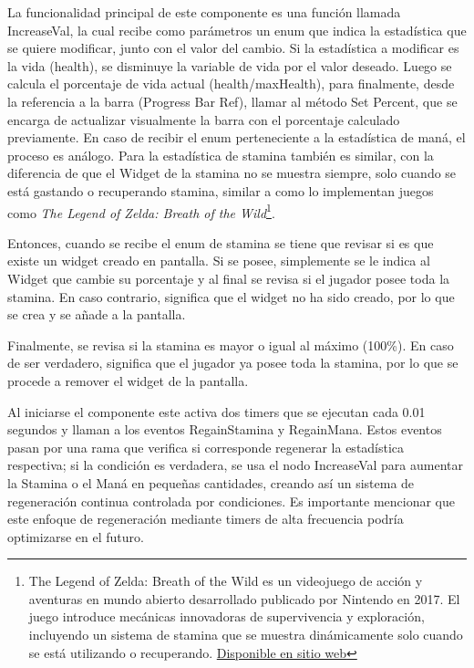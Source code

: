 \documentclass[informe]{upropuesta}
\begin{document}
La funcionalidad principal de este componente es una función llamada IncreaseVal, la cual recibe como parámetros un enum que indica la estadística que se quiere modificar, junto con el valor del cambio. Si la estadística a modificar es la vida (health), se disminuye la variable de vida por el valor deseado. Luego se calcula el porcentaje de vida actual (health/maxHealth), para finalmente, desde la referencia a la barra (Progress Bar Ref), llamar al método Set Percent, que se encarga de actualizar visualmente la barra con el porcentaje calculado previamente. En caso de recibir el enum perteneciente a la estadística de maná, el proceso es análogo. Para la estadística de stamina también es similar, con la diferencia de que el Widget de la stamina no se muestra siempre, solo cuando se está gastando o recuperando stamina, similar a como lo implementan juegos como \textit{The Legend of Zelda: Breath of the Wild}\footnote{The Legend of Zelda: Breath of the Wild es un videojuego de acción y aventuras en mundo abierto desarrollado publicado por Nintendo en 2017. El juego introduce mecánicas innovadoras de supervivencia y exploración, incluyendo un sistema de stamina que se muestra dinámicamente solo cuando se está utilizando o recuperando. \href{https://www.zelda.com/breath-of-the-wild/}{Disponible en sitio web}}.

Entonces, cuando se recibe el enum de stamina se tiene que revisar si es que existe un widget creado en pantalla. Si se posee, simplemente se le indica al Widget que cambie su porcentaje y al final se revisa si el jugador posee toda la stamina. En caso contrario, significa que el widget no ha sido creado, por lo que se crea y se añade a la pantalla.

Finalmente, se revisa si la stamina es mayor o igual al máximo (100\%). En caso de ser verdadero, significa que el jugador ya posee toda la stamina, por lo que se procede a remover el widget de la pantalla.

Al iniciarse el componente este activa dos timers que se ejecutan cada 0.01 segundos y llaman a los eventos RegainStamina y RegainMana. Estos eventos pasan por una rama que verifica si corresponde regenerar la estadística respectiva; si la condición es verdadera, se usa el nodo IncreaseVal para aumentar la Stamina o el Maná en pequeñas cantidades, creando así un sistema de regeneración continua controlada por condiciones. Es importante mencionar que este enfoque de regeneración mediante timers de alta frecuencia podría optimizarse en el futuro.
\end{document}
